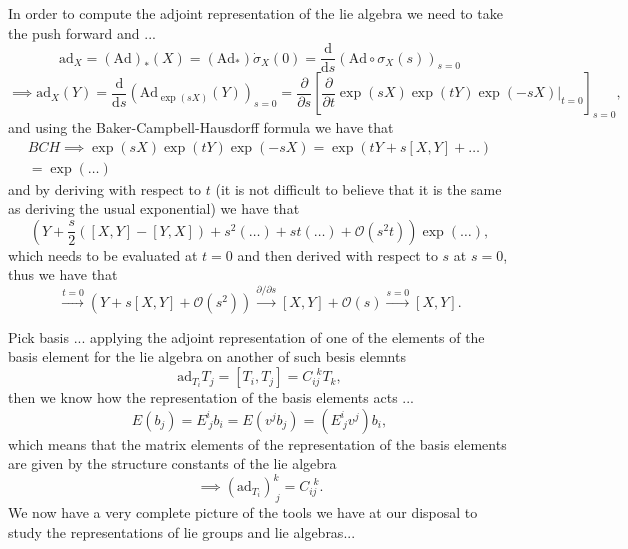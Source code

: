 In order to compute the adjoint representation of the lie algebra we need to take the push forward and ...
\[
    \mathrm{ad}_X = (\mathrm{Ad})_* (X) = (\mathrm{Ad}_*)\dot{\sigma}_X(0) = \frac{\mathrm{d}}{\mathrm{d} s} (\mathrm{Ad} \circ \sigma_X(s))_{s=0}
\]
\[
    \implies \mathrm{ad}_X (Y) = \frac{\mathrm{d}}{\mathrm{d} s} (\mathrm{Ad}_{\exp(sX)}(Y))_{s=0} = \frac{\partial}{\partial s}\left[ \frac{\partial}{\partial t} \exp(sX)\exp(tY)\exp(-sX)\big|_{t=0}\right]_{s=0},
\]
and using the Baker-Campbell-Hausdorff formula we have that
\[
    \begin{aligned}
        BCH \implies \exp(sX)\exp(tY)\exp(-sX) = \exp\left( tY + s[X, Y] + \dots \right) \\
        =  \exp(\dots )
    \end{aligned}
\]
and by deriving with respect to \(t\) (it is not difficult to believe that it is the same as deriving the usual exponential) we have that
\[
    \left(Y + \frac{s}{2} ([X, Y] - [Y, X]) + s^2 (\dots) + st(\dots) + \mathcal{O}(s^2t)\right) \exp(\dots),
\]
which needs to be evaluated at \(t=0\) and then derived with respect to \(s\) at \(s=0\), thus we have that
\[
    \xrightarrow{t=0} \left(Y + s[X,Y] + \mathcal{O}(s^2)\right) \xrightarrow{\partial / \partial s} [X, Y] + \mathcal{O}(s) \xrightarrow{s=0} [X, Y].
\]

Pick basis ... applying the adjoint representation of one of the elements of the basis element for the lie algebra on another of such besis elemnts
\[
    \mathrm{ad}_{T_i}T_j = [T_i, T_j] = C_{ij}^{\ \ k} T_k,
\]
then we know how the representation of the basis elements acts ...
\[
    E(b_j) = E^i_{\ j} b_i = E(v^j b_j) = (E^i_{\ j}v^j)b_i,
\]
which means that the matrix elements of the representation of the basis elements are given by the structure constants of the lie algebra
\[
    \implies (\mathrm{ad}_{T_i})^k_{\ j} = C_{ij}^{\ \ k}.
\]
We now have a very complete picture of the tools we have at our disposal to study the representations of lie groups and lie algebras...

